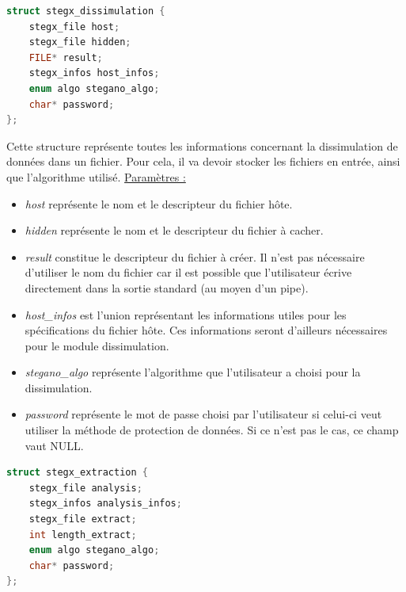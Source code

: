 \documentclass[11pt]{article}
\begin{document}
\begin{lstlisting}[language=c]
struct stegx_dissimulation {
    stegx_file host;
    stegx_file hidden;
    FILE* result;
    stegx_infos host_infos;
    enum algo stegano_algo;
    char* password;
};
\end{lstlisting}

Cette structure représente toutes les informations concernant la dissimulation 
de données dans un fichier. Pour cela, il va devoir stocker les fichiers en 
entrée, ainsi que l'algorithme utilisé. \newline
\underline{Paramètres :} 
\begin{itemize}
\item \textit{host} représente le nom et le descripteur du fichier hôte.  
\item \textit{hidden} représente le nom et le descripteur du fichier à cacher. 
\item \textit{result} constitue le descripteur du fichier à créer. Il n'est pas 
nécessaire d'utiliser le nom du fichier car il est possible que l'utilisateur 
écrive directement dans la sortie standard (au moyen d'un pipe).
\item \textit{host\_infos} est l'union représentant les informations utiles pour 
les spécifications du fichier hôte. Ces informations seront d'ailleurs 
nécessaires pour le module dissimulation. 
\item \textit{stegano\_algo} représente l'algorithme que l'utilisateur a choisi 
pour la dissimulation. 
\item \textit{password} représente le mot de passe choisi par l'utilisateur si 
celui-ci veut utiliser la méthode de protection de données. Si ce n'est 
pas le cas, ce champ vaut NULL.
\newline
\end{itemize}

\begin{lstlisting}[language=c]
struct stegx_extraction {
    stegx_file analysis;
    stegx_infos analysis_infos;
    stegx_file extract;
    int length_extract;
    enum algo stegano_algo;
    char* password;
};
\end{lstlisting}
\end{document}
